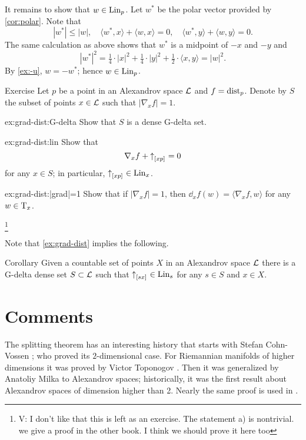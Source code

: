 It remains to show that $w\in\mathop{\rm Lin}\nolimits_p$.
Let $w^*$ be the polar vector provided by \ref{cor:polar}.
Note that 
\[|w^*|\le |w|,
\quad
\langle w^*,x\rangle+\langle w,x\rangle=0,
\quad
\langle w^*,y\rangle+\langle w,y\rangle=0.
\]
The same calculation as above shows that $w^*$ is a midpoint of $-x$ and $-y$ and 
\[|w^*|^2= \tfrac14\cdot |x|^2+\tfrac14\cdot|y|^2+\tfrac12\cdot\langle x,y\rangle=|w|^2.\]
By \ref{ex:-u}, $w=-w^*$;
hence $w\in\mathop{\rm Lin}\nolimits_p$.
\qeds



\begin{thm}{Exercise}\label{ex:grad-dist}
Let $p$ be a point in an Alexandrov space $\mathcal{L}$ and $f\z=\distfun_p$.
Denote by $S$ the subset of points $x\in\mathcal{L}$ such that $|\nabla_xf|=1$.

\begin{subthm}{ex:grad-dist:G-delta}
Show that $S$ is a dense G-delta set.
\end{subthm}

\begin{subthm}{ex:grad-dist:lin}
Show that 
\[\nabla_xf+{\uparrow}_{[{x}{p}]_{{}}}=0\]
for any 
$x\in S$;
in particular, ${\uparrow}_{[{x}{p}]_{{}}}\in \mathop{\rm Lin}\nolimits_x$.
\end{subthm}

\begin{subthm}{ex:grad-dist:|grad|=1}
Show that if $|\nabla_xf|=1$, then $\dd_xf(w)= \langle\nabla_xf,w\rangle$ for any $w\in \mathrm{T}_x$.
\end{subthm}
\footnote{\red V: I don't like that this is left as an exercise. The statement a) is nontrivial. we give a proof in the other book. I think we should prove it here too}

\end{thm}

Note that \ref{ex:grad-dist} implies the following.

\begin{thm}{Corollary}\label{cor:euclid-subcone}
Given a countable set of points $X$ in an Alexandrov space $\mathcal{L}$
there is a G-delta dense set $S\subset\mathcal{L}$
such that 
${\uparrow}_{[{s}{x}]_{{}}}\in \mathop{\rm Lin}\nolimits_s$
for any $s\in S$ and $x\in X$.
\end{thm}

\section{Comments}

The splitting theorem has an interesting history that starts with Stefan Cohn-Vossen \cite{cohn-vossen_line};
who proved its $2$-dimensional case.
For Riemannian manifolds of higher dimensions 
it was proved by Victor Toponogov \cite{toponogov-globalization+splitting}.
Then it was generalized by Anatoliy Milka \cite{milka-line}
to Alexandrov spaces;
historically, it was the first result about Alexandrov spaces of dimension higher than 2.
Nearly the same proof is used in \cite[1.5]{burago-burago-ivanov}.

